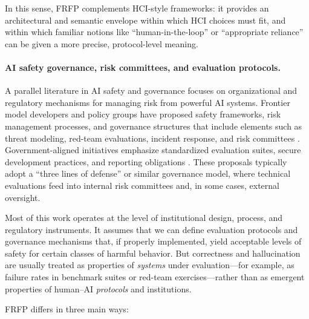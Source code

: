 \documentclass[11pt]{article}
\theoremstyle{definition}
\begin{document}
In this sense, FRFP complements HCI-style frameworks: it provides an architectural and semantic envelope within which HCI choices must fit, and within which familiar notions like ``human-in-the-loop'' or ``appropriate reliance'' can be given a more precise, protocol-level meaning.

\paragraph{AI safety governance, risk committees, and evaluation protocols.}
A parallel literature in AI safety and governance focuses on organizational and regulatory mechanisms for managing risk from powerful AI systems. Frontier model developers and policy groups have proposed safety frameworks, risk management processes, and governance structures that include elements such as threat modeling, red-team evaluations, incident response, and risk committees \citep{frontierModelForum2024components,robinson2024transforming_risk_governance,governanceai2023frontier_regulation,rand2025governance_frontier_ai,concordia2025frontier_risk}. Government-aligned initiatives emphasize standardized evaluation suites, secure development practices, and reporting obligations \citep{aisi2025inspect_ai,cset2025ai_preparedness}. These proposals typically adopt a ``three lines of defense'' or similar governance model, where technical evaluations feed into internal risk committees and, in some cases, external oversight.

Most of this work operates at the level of institutional design, process, and regulatory instruments. It assumes that we can define evaluation protocols and governance mechanisms that, if properly implemented, yield acceptable levels of safety for certain classes of harmful behavior. But correctness and hallucination are usually treated as properties of \emph{systems} under evaluation---for example, as failure rates in benchmark suites or red-team exercises---rather than as emergent properties of human--AI \emph{protocols} and institutions.

FRFP differs in three main ways:
\end{document}
